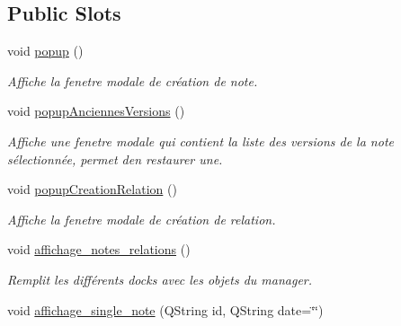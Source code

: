 \subsection*{Public Slots}
\begin{DoxyCompactItemize}
\item 
\mbox{\label{class_fen_principale_a87ca6c2647ca958c60bac70512da5899}} 
void \hyperlink{class_fen_principale_a87ca6c2647ca958c60bac70512da5899}{popup} ()
\begin{DoxyCompactList}\small\item\em Affiche la fenetre modale de création de note. \end{DoxyCompactList}\item 
\mbox{\label{class_fen_principale_a59e1d3d260dd7dc4bec7585695dad965}} 
void \hyperlink{class_fen_principale_a59e1d3d260dd7dc4bec7585695dad965}{popup\+Anciennes\+Versions} ()
\begin{DoxyCompactList}\small\item\em Affiche une fenetre modale qui contient la liste des versions de la note sélectionnée, permet d\textquotesingle{}en restaurer une. \end{DoxyCompactList}\item 
\mbox{\label{class_fen_principale_a04c6b879bd8bc7c7ddf164ce9b4273b1}} 
void \hyperlink{class_fen_principale_a04c6b879bd8bc7c7ddf164ce9b4273b1}{popup\+Creation\+Relation} ()
\begin{DoxyCompactList}\small\item\em Affiche la fenetre modale de création de relation. \end{DoxyCompactList}\item 
\mbox{\label{class_fen_principale_a1e99bb2ccb692e8d084b0c667bfd364f}} 
void \hyperlink{class_fen_principale_a1e99bb2ccb692e8d084b0c667bfd364f}{affichage\+\_\+notes\+\_\+relations} ()
\begin{DoxyCompactList}\small\item\em Remplit les différents docks avec les objets du manager. \end{DoxyCompactList}\item 
void \hyperlink{class_fen_principale_a6cc4b79a54ed443cced0fb03f7f83619}{affichage\+\_\+single\+\_\+note} (Q\+String id, Q\+String date=\char`\"{}\char`\"{})

\end{DoxyCompactItemize}
